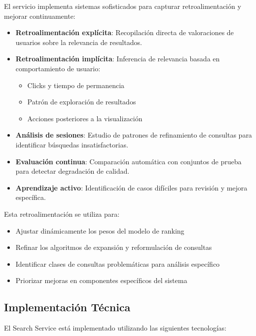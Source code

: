 \documentclass[12pt,a4paper]{article}
\begin{document}
El servicio implementa sistemas sofisticados para capturar retroalimentación y mejorar continuamente:

\begin{itemize}
    \item \textbf{Retroalimentación explícita}: Recopilación directa de valoraciones de usuarios sobre la relevancia de resultados.
    
    \item \textbf{Retroalimentación implícita}: Inferencia de relevancia basada en comportamiento de usuario:
    \begin{itemize}
        \item Clicks y tiempo de permanencia
        \item Patrón de exploración de resultados
        \item Acciones posteriores a la visualización
    \end{itemize}
    
    \item \textbf{Análisis de sesiones}: Estudio de patrones de refinamiento de consultas para identificar búsquedas insatisfactorias.
    
    \item \textbf{Evaluación continua}: Comparación automática con conjuntos de prueba para detectar degradación de calidad.
    
    \item \textbf{Aprendizaje activo}: Identificación de casos difíciles para revisión y mejora específica.
\end{itemize}

Esta retroalimentación se utiliza para:
\begin{itemize}
    \item Ajustar dinámicamente los pesos del modelo de ranking
    \item Refinar los algoritmos de expansión y reformulación de consultas
    \item Identificar clases de consultas problemáticas para análisis específico
    \item Priorizar mejoras en componentes específicos del sistema
\end{itemize}

\subsection{Implementación Técnica}
\label{subsec:ss-implementacion}

El Search Service está implementado utilizando las siguientes tecnologías:
\end{document}
